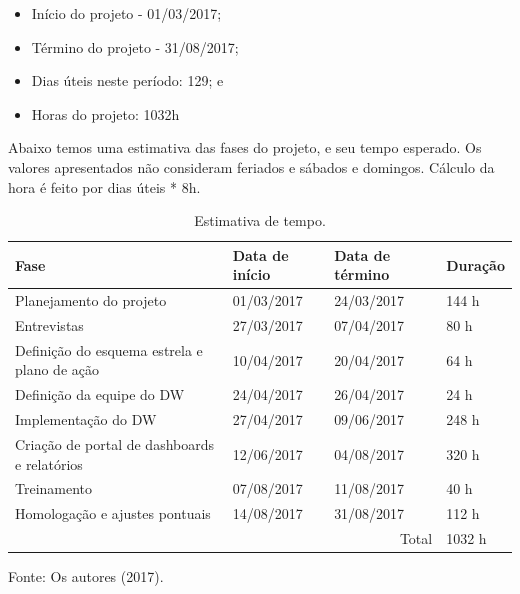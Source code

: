 \begin{itemize}
    \item Início do projeto - 01/03/2017;    
    \item Término do projeto - 31/08/2017;    
    \item Dias úteis neste período: 129; e
    \item Horas do projeto: 1032h
\end{itemize}

Abaixo temos uma estimativa das fases do projeto, e seu tempo esperado.
Os valores apresentados não consideram feriados e sábados e domingos. Cálculo da hora é feito por dias úteis * 8h.

\begin{table}[!htb]
    \begin{center}
        \caption{Estimativa de tempo.} \label{tab:tempo}
        \begin{tabular}{ p{3cm} |  p{2.2cm} | p{2.3cm} | p{1.2cm} }
            \hline
            \textbf{Fase} & \textbf{Data de início}  & \textbf{Data de término} & \textbf{Duração} \\
            \hline
            Planejamento do projeto & 01/03/2017 & 24/03/2017 & 144 h \\
            \hline
            Entrevistas &
            27/03/2017 &
            07/04/2017 &
            80 h \\
            \hline
            Definição do esquema estrela e plano de ação &
            10/04/2017 &
            20/04/2017 &
            64 h \\
            \hline        
            Definição da equipe do DW &
            24/04/2017 &
            26/04/2017 &
            24 h \\
            \hline 
            Implementação do DW &
            27/04/2017 &
            09/06/2017 &
            248 h \\
            \hline            
            Criação de portal de dashboards e relatórios &
            12/06/2017 &
            04/08/2017 &
            320 h \\
            \hline 
            Treinamento &
            07/08/2017 &
            11/08/2017 &
            40 h \\
            \hline
            Homologação e ajustes pontuais &
            14/08/2017 &
            31/08/2017 &
            112 h \\
            \hline
            \multicolumn{3}{r|}{Total} & 1032 h \\
            \hline

        \end{tabular}
    \end{center}
    Fonte: Os autores (2017).
\end{table}


